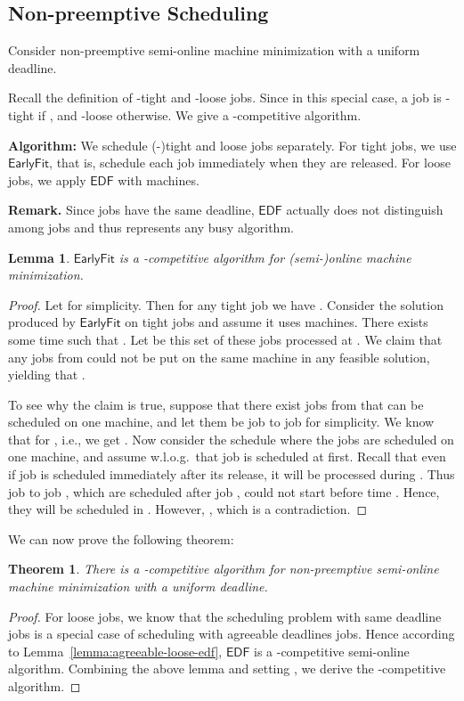 \documentclass[letterpaper,11pt]{article}
\newtheorem{theorem}{Theorem}
\newtheorem{lemma}{Lemma}
\newcommand{\EDF}{\ensuremath{\mathsf{EDF}}\xspace}
\newcommand{\Earlyfit}{\ensuremath{\mathsf{EarlyFit}}\xspace}
\begin{document}
\subsection{Non-preemptive Scheduling}

Consider non-preemptive semi-online machine minimization with a uniform deadline.

Recall the definition of -tight and -loose jobs. Since  in this special case, a job is -tight if , and -loose otherwise. We give a -competitive algorithm.

\medskip
\noindent\textbf{Algorithm:} We schedule (-)tight and loose jobs separately. 
For tight jobs, we use \Earlyfit, that is, schedule each job immediately when they are released. For loose jobs, we apply \EDF with  machines.
\medskip

\noindent\textbf{Remark.} Since jobs have the same deadline, \EDF actually does not distinguish among jobs and thus represents any busy algorithm.

\begin{lemma}\label{lemma:nonpre-deadline-optknown}
\Earlyfit is a -competitive algorithm for (semi-)online machine minimization.
\end{lemma}
\begin{proof}
Let  for simplicity. Then for any tight job  we have . Consider the solution produced by \Earlyfit on tight jobs and assume it uses  machines. There exists some time  such that . Let  be this set of these  jobs processed at . We claim that any  jobs from  could not be put on the same machine in any feasible solution, yielding that .

To see why the claim is true, suppose that there exist  jobs from  that can be scheduled on one machine, and let them be job  to job  for simplicity. We know that  for , i.e., we get . Now consider the schedule where the  jobs are scheduled on one machine, and assume w.l.o.g.~that job  is scheduled at first. Recall that even if job  is scheduled immediately after its release, it will be processed during . Thus job  to job , which are scheduled after job , could not start before time . Hence, they will be scheduled in . However, , which is a contradiction. 
\end{proof}

We can now prove the following theorem:

\begin{theorem}
  There is a -competitive algorithm for non-preemptive semi-online machine minimization with a uniform deadline.
\end{theorem}
\begin{proof}
For loose jobs, we know that the scheduling problem with same deadline jobs is a special case of scheduling with agreeable deadlines jobs. Hence according to Lemma~\ref{lemma:agreeable-loose-edf}, \EDF is a -competitive semi-online algorithm. 
Combining the above lemma and setting , we derive the -competitive algorithm.
\end{proof}
\end{document}
